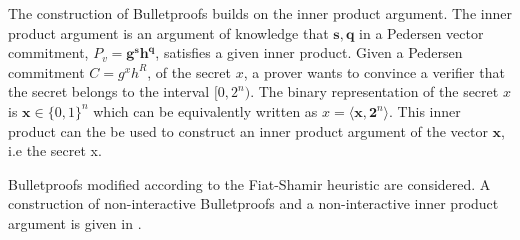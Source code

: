 The construction of Bulletproofs builds on the inner product argument. The inner product argument is an argument of knowledge that $\textbf{s},\mathbf{q}$ in a Pedersen vector commitment, $P_v=\mathbf{g}^\mathbf{s}\mathbf{h}^\mathbf{q}$, satisfies a given inner product. Given a Pedersen commitment $C=g^x h^R$, of the secret $x$, a prover wants to convince a verifier that the secret belongs to the interval $[0,2^n)$.  The binary representation of the secret $x$ is $\bm{x}\in\{0,1\}^n$ which can be  equivalently written as $x= \langle \bm{x},\mathbf{2}^n\rangle $. This inner product can the be used to construct an inner product argument of the vector  $\mathbf{x}$, i.e the secret x.

Bulletproofs modified according to the Fiat-Shamir heuristic are considered. A construction of non-interactive Bulletproofs and a non-interactive inner product argument is given in \cite{ZKRP_Morais}.






